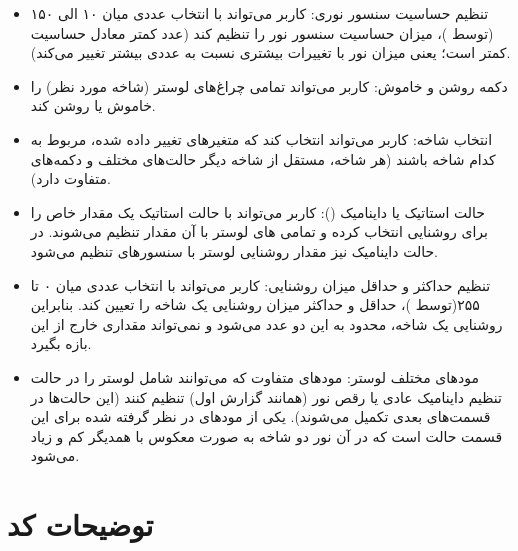 \documentclass[12pt,a4paper]{article}
\begin{document}
	\begin{itemize}
		\item 
		{تنظیم حساسیت سنسور نوری:} کاربر می‌تواند با انتخاب عددی میان ۱۰ الی ۱۵۰ (توسط )، میزان حساسیت سنسور نور را تنظیم کند (عدد کمتر معادل حساسیت کمتر است؛ یعنی میزان نور با تغییرات بیشتری نسبت به عددی بیشتر تغییر می‌کند).
		\item 
		{دکمه روشن و خاموش:} کاربر می‌تواند تمامی چراغ‌های لوستر (شاخه مورد نظر) را خاموش یا روشن کند.
		\item 
		{انتخاب شاخه:} کاربر می‌تواند انتخاب کند که متغیرهای تغییر داده شده، مربوط به کدام شاخه باشند (هر شاخه، مستقل از شاخه دیگر حالت‌های مختلف و دکمه‌های متفاوت دارد).
		\item 
		{حالت استاتیک یا داینامیک ():} کاربر می‌تواند با حالت استاتیک یک مقدار خاص را برای روشنایی انتخاب کرده و تمامی  های لوستر با آن مقدار تنظیم می‌شوند. در حالت داینامیک نیز مقدار روشنایی لوستر با سنسورهای تنظیم می‌شود.
		\item 
		{تنظیم حداکثر و حداقل میزان روشنایی:} کاربر می‌تواند با انتخاب عددی میان ۰ تا ۲۵۵(توسط )، حداقل و حداکثر میزان روشنایی یک شاخه را تعیین کند. بنابراین روشنایی یک شاخه، محدود به این دو عدد می‌شود و نمی‌تواند مقداری خارج از این بازه بگیرد.
		\item 
		{مودهای مختلف لوستر:} مودهای متفاوت که می‌توانند شامل لوستر را در حالت تنظیم داینامیک عادی یا رقص نور (همانند گزارش اول) تنظیم کنند (این حالت‌ها در قسمت‌های بعدی تکمیل می‌شوند). یکی از مودهای در نظر گرفته شده برای این قسمت حالت  است که در آن نور دو شاخه به صورت معکوس با همدیگر کم و زیاد می‌شود.
		
	\end{itemize}
\newpage
	\section{توضیحات کد}
	
	
	
	

		\newpage
\end{document}
